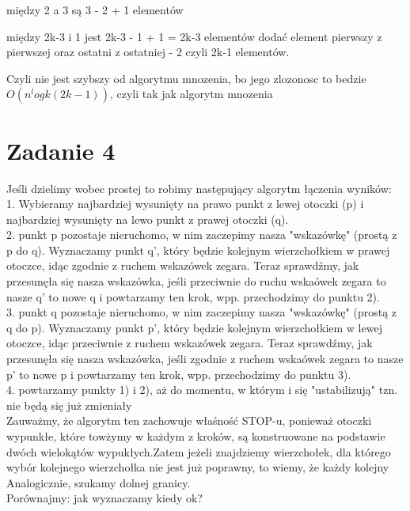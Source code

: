 \documentclass[12pt]{article}
\begin{document}
między 2 a 3 są 3 - 2 + 1 elementów 

między 2k-3 i 1 jest 2k-3 - 1 + 1 = 2k-3 elementów 
dodać element pierwszy z pierwszej oraz ostatni z ostatniej - 2 
czyli 2k-1 elementów.

Czyli nie jest szybszy od algorytmu mnozenia, bo jego zlozonosc to bedzie 
$O(n^logk(2k-1))$, czyli tak jak algorytm mnozenia



\section{Zadanie 4}

Jeśli dzielimy wobec prostej to robimy następujący algorytm łączenia wyników:\\

1. Wybieramy najbardziej wysunięty na prawo punkt z lewej otoczki (p) i najbardziej wysunięty na lewo punkt z prawej otoczki (q).\\

2. punkt p pozostaje nieruchomo, w nim zaczepimy nasza "wskazówkę" (prostą z p do q). Wyznaczamy punkt q', który będzie kolejnym wierzchołkiem w prawej otoczce, idąc zgodnie z ruchem wskazówek zegara. Teraz sprawdźmy, jak przesunęła się nasza wskazówka, jeśli przeciwnie do ruchu wskaówek zegara to nasze q' to nowe q i powtarzamy ten krok, wpp. przechodzimy do punktu 2).\\

3. punkt q pozostaje nieruchomo, w nim zaczepimy nasza "wskazówkę" (prostą z q do p). Wyznaczamy punkt p', który będzie kolejnym wierzchołkiem w lewej otoczce, idąc przeciwnie z ruchem wskazówek zegara. Teraz sprawdźmy, jak przesunęła się nasza wskazówka, jeśli zgodnie z ruchem wskaówek zegara to nasze p' to nowe p
i powtarzamy ten krok, wpp. przechodzimy do punktu 3).\\

4. powtarzamy punkty 1) i 2), aż do momentu, w którym
i się "ustabilizują" tzn. nie będą się już zmieniały\\

Zauważmy, że algorytm ten zachowuje właśność STOP-u, ponieważ otoczki wypunkłe, które towżymy w każdym z kroków, są konstruowane na podstawie dwóch wielokątów wypukłych.Zatem jeżeli znajdziemy wierzchołek, dla którego wybór kolejnego wierzchołka nie jest już poprawny, to wiemy, że każdy kolejny\\

Analogicznie, szukamy dolnej granicy.\\
Porównajmy:
         jak wyznaczamy 	kiedy ok?
		
\end{document}
